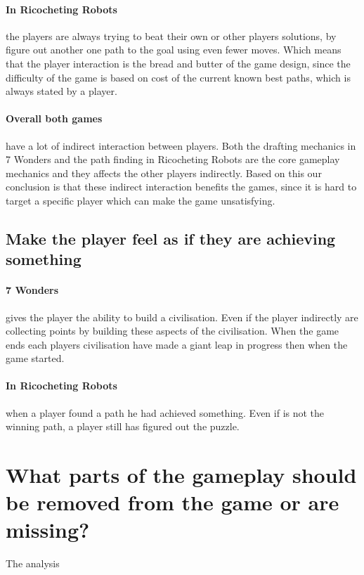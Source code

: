 \documentclass[a4paper]{article}
\begin{document}
\paragraph{In Ricocheting Robots} the players are always trying to beat their own or other players solutions, by figure out another one path to the goal using even fewer moves. Which means that the player interaction is the bread and butter of the game design, since the difficulty of the game is based on cost of the current known best paths, which is always stated by a player. 

\paragraph{Overall both games} have a lot of indirect interaction between players. Both the drafting mechanics in 7 Wonders and the path finding in Ricocheting Robots are the core gameplay mechanics and they affects the other players indirectly. Based on this our conclusion is that these indirect interaction benefits the games, since it is hard to target a specific player which can make the game unsatisfying.

\subsection{Make the player feel as if they are achieving something}
\paragraph{7 Wonders} gives the player the ability to build a civilisation. Even if the player indirectly are collecting points by building these aspects of the civilisation. When the game ends each players civilisation have made a giant leap in progress then when the game started. 

\paragraph{In Ricocheting Robots} when a player found a path he had achieved something. Even if is not the winning path, a player still has figured out the puzzle.

\section{What parts of the gameplay should be removed from the game or are missing?}
The analysis 


\newpage


\end{document}

